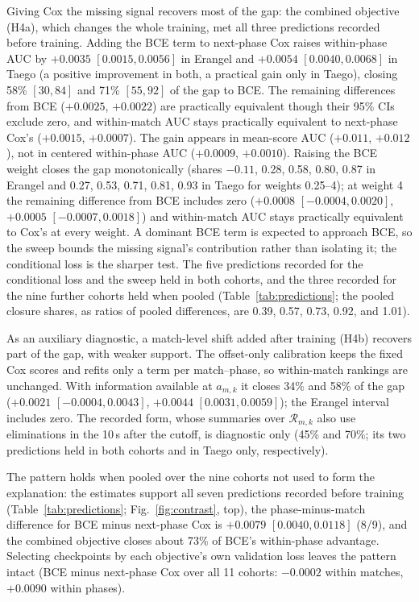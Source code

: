 \documentclass[sigconf,anonymous]{acmart}
\begin{document}
Giving Cox the missing signal recovers most of the gap: the combined objective (H4a), which changes the whole training, met all three predictions recorded before training. Adding the BCE term to next-phase Cox raises within-phase AUC by $+0.0035$ $[0.0015,\allowbreak 0.0056]$ in Erangel and $+0.0054$ $[0.0040,\allowbreak 0.0068]$ in Taego (a positive improvement in both, a practical gain only in Taego), closing 58\% $[30,\allowbreak 84]$ and 71\% $[55,\allowbreak 92]$ of the gap to BCE. The remaining differences from BCE ($+0.0025$, $+0.0022$) are practically equivalent though their 95\% CIs exclude zero, and within-match AUC stays practically equivalent to next-phase Cox's ($+0.0015$, $+0.0007$). The gain appears in mean-score AUC ($+0.011$, $+0.012$), not in centered within-phase AUC ($+0.0009$, $+0.0010$). Raising the BCE weight closes the gap monotonically (shares $-0.11$, 0.28, 0.58, 0.80, 0.87 in Erangel and 0.27, 0.53, 0.71, 0.81, 0.93 in Taego for weights 0.25--4); at weight 4 the remaining difference from BCE includes zero ($+0.0008$ $[-0.0004,\allowbreak 0.0020]$, $+0.0005$ $[-0.0007,\allowbreak 0.0018]$) and within-match AUC stays practically equivalent to Cox's at every weight. A dominant BCE term is expected to approach BCE, so the sweep bounds the missing signal's contribution rather than isolating it; the conditional loss is the sharper test. The five predictions recorded for the conditional loss and the sweep held in both cohorts, and the three recorded for the nine further cohorts held when pooled (Table~\ref{tab:predictions}; the pooled closure shares, as ratios of pooled differences, are 0.39, 0.57, 0.73, 0.92, and 1.01).

As an auxiliary diagnostic, a match-level shift added after training (H4b) recovers part of the gap, with weaker support. The offset-only calibration keeps the fixed Cox scores and refits only a term per match--phase, so within-match rankings are unchanged. With information available at $a_{m,k}$ it closes 34\% and 58\% of the gap ($+0.0021$ $[-0.0004,\allowbreak 0.0043]$, $+0.0044$ $[0.0031,\allowbreak 0.0059]$); the Erangel interval includes zero. The recorded form, whose summaries over $\mathcal{R}_{m,k}$ also use eliminations in the 10\,s after the cutoff, is diagnostic only (45\% and 70\%; its two predictions held in both cohorts and in Taego only, respectively).


The pattern holds when pooled over the nine cohorts not used to form the explanation: the estimates support all seven predictions recorded before training (Table~\ref{tab:predictions}; Fig.~\ref{fig:contrast}, top), the phase-minus-match difference for BCE minus next-phase Cox is $+0.0079$ $[0.0040,\allowbreak 0.0118]$ (8/9), and the combined objective closes about 73\% of BCE's within-phase advantage. Selecting checkpoints by each objective's own validation loss leaves the pattern intact (BCE minus next-phase Cox over all 11 cohorts: $-0.0002$ within matches, $+0.0090$ within phases).
\end{document}

